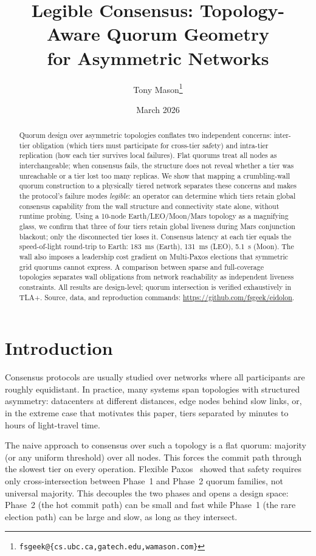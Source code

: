 \documentclass[11pt]{article}
\title{Legible Consensus: Topology-Aware Quorum Geometry\\for Asymmetric Networks}
\author{Tony Mason\thanks{\texttt{fsgeek@\{cs.ubc.ca,gatech.edu,wamason.com\}}}}
\date{March 2026}
\begin{document}
\maketitle

\begin{abstract}
Quorum design over asymmetric topologies conflates two independent concerns: inter-tier obligation (which tiers must participate for cross-tier safety) and intra-tier replication (how each tier survives local failures). Flat quorums treat all nodes as interchangeable; when consensus fails, the structure does not reveal whether a tier was unreachable or a tier lost too many replicas. We show that mapping a crumbling-wall quorum construction to a physically tiered network separates these concerns and makes the protocol's failure modes \emph{legible}: an operator can determine which tiers retain global consensus capability from the wall structure and connectivity state alone, without runtime probing. Using a 10-node Earth/LEO/Moon/Mars topology as a magnifying glass, we confirm that three of four tiers retain global liveness during Mars conjunction blackout; only the disconnected tier loses it. Consensus latency at each tier equals the speed-of-light round-trip to Earth: 183~ms (Earth), 131~ms (LEO), 5.1~s (Moon). The wall also imposes a leadership cost gradient on Multi-Paxos elections that symmetric grid quorums cannot express. A comparison between sparse and full-coverage topologies separates wall obligations from network reachability as independent liveness constraints. All results are design-level; quorum intersection is verified exhaustively in TLA+. Source, data, and reproduction commands: \url{https://github.com/fsgeek/eidolon}.
\end{abstract}

\section{Introduction}

Consensus protocols are usually studied over networks where all participants are roughly equidistant. In practice, many systems span topologies with structured asymmetry: datacenters at different distances, edge nodes behind slow links, or, in the extreme case that motivates this paper, tiers separated by minutes to hours of light-travel time.

The naive approach to consensus over such a topology is a flat quorum: majority (or any uniform threshold) over all nodes. This forces the commit path through the slowest tier on every operation. Flexible Paxos~\cite{howard2016} showed that safety requires only cross-intersection between Phase~1 and Phase~2 quorum families, not universal majority. This decouples the two phases and opens a design space: Phase~2 (the hot commit path) can be small and fast while Phase~1 (the rare election path) can be large and slow, as long as they intersect.
\end{document}
